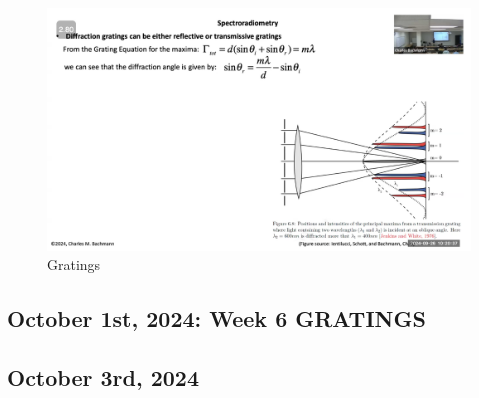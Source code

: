 \documentclass{article}
\begin{document}
\begin{figure}[h!]
\centering
\includegraphics[scale=.4]{Radiometry/Week5/Notes/Gratings/MUM9.png}
\caption{Gratings}
\label{fig:Blackbody}
\end{figure}


\subsection{October 1st, 2024: Week 6 GRATINGS}



\clearpage


\subsection{October 3rd, 2024}






\clearpage
\end{document}
